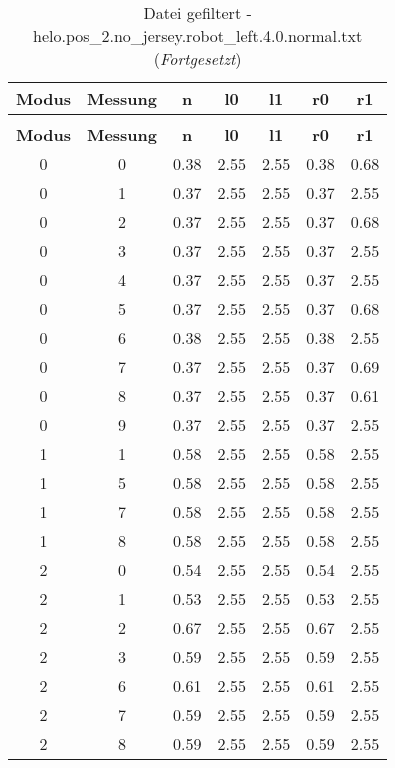 \begin{longtable}{|c|c||c||c|c||c|c|}
	\caption{Datei gefiltert - helo.pos\_2.no\_jersey.robot\_left.4.0.normal.txt} \label{tab:helo.pos-2.no-jersey.robot-left.4.0.normal.txt} \\ \hline
	\textbf{Modus} & \textbf{Messung} & \textbf{n} & \textbf{l0} & \textbf{l1} & \textbf{r0} & \textbf{r1}\\ \hline
	\endfirsthead
	\caption[]{Datei gefiltert - helo.pos\_2.no\_jersey.robot\_left.4.0.normal.txt (\emph{Fortgesetzt})} \\ \hline
	\textbf{Modus} & \textbf{Messung} & \textbf{n} & \textbf{l0} & \textbf{l1} & \textbf{r0} & \textbf{r1}\\ \hline
	\endhead
	0 & 0 & 0.38 & 2.55 & 2.55 & 0.38 & 0.68 \\ \hline
	0 & 1 & 0.37 & 2.55 & 2.55 & 0.37 & 2.55 \\ \hline
	0 & 2 & 0.37 & 2.55 & 2.55 & 0.37 & 0.68 \\ \hline
	0 & 3 & 0.37 & 2.55 & 2.55 & 0.37 & 2.55 \\ \hline
	0 & 4 & 0.37 & 2.55 & 2.55 & 0.37 & 2.55 \\ \hline
	0 & 5 & 0.37 & 2.55 & 2.55 & 0.37 & 0.68 \\ \hline
	0 & 6 & 0.38 & 2.55 & 2.55 & 0.38 & 2.55 \\ \hline
	0 & 7 & 0.37 & 2.55 & 2.55 & 0.37 & 0.69 \\ \hline
	0 & 8 & 0.37 & 2.55 & 2.55 & 0.37 & 0.61 \\ \hline
	0 & 9 & 0.37 & 2.55 & 2.55 & 0.37 & 2.55 \\ \hline
	1 & 1 & 0.58 & 2.55 & 2.55 & 0.58 & 2.55 \\ \hline
	1 & 5 & 0.58 & 2.55 & 2.55 & 0.58 & 2.55 \\ \hline
	1 & 7 & 0.58 & 2.55 & 2.55 & 0.58 & 2.55 \\ \hline
	1 & 8 & 0.58 & 2.55 & 2.55 & 0.58 & 2.55 \\ \hline
	2 & 0 & 0.54 & 2.55 & 2.55 & 0.54 & 2.55 \\ \hline
	2 & 1 & 0.53 & 2.55 & 2.55 & 0.53 & 2.55 \\ \hline
	2 & 2 & 0.67 & 2.55 & 2.55 & 0.67 & 2.55 \\ \hline
	2 & 3 & 0.59 & 2.55 & 2.55 & 0.59 & 2.55 \\ \hline
	2 & 6 & 0.61 & 2.55 & 2.55 & 0.61 & 2.55 \\ \hline
	2 & 7 & 0.59 & 2.55 & 2.55 & 0.59 & 2.55 \\ \hline
	2 & 8 & 0.59 & 2.55 & 2.55 & 0.59 & 2.55 \\ \hline

\end{longtable}
